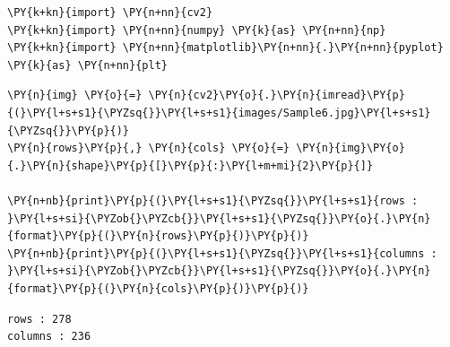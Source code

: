 \vspace{0.5cm}

\begin{tcolorbox}[breakable, size=fbox, boxrule=1pt, pad at break*=1mm,colback=cellbackground, colframe=cellborder]
	\begin{Verbatim}[commandchars=\\\{\}]
\PY{k+kn}{import} \PY{n+nn}{cv2}
\PY{k+kn}{import} \PY{n+nn}{numpy} \PY{k}{as} \PY{n+nn}{np}
\PY{k+kn}{import} \PY{n+nn}{matplotlib}\PY{n+nn}{.}\PY{n+nn}{pyplot} \PY{k}{as} \PY{n+nn}{plt}
	\end{Verbatim}
\end{tcolorbox}

\begin{tcolorbox}[breakable, size=fbox, boxrule=1pt, pad at break*=1mm,colback=cellbackground, colframe=cellborder]
	\begin{Verbatim}[commandchars=\\\{\}]
\PY{n}{img} \PY{o}{=} \PY{n}{cv2}\PY{o}{.}\PY{n}{imread}\PY{p}{(}\PY{l+s+s1}{\PYZsq{}}\PY{l+s+s1}{images/Sample6.jpg}\PY{l+s+s1}{\PYZsq{}}\PY{p}{)}
\PY{n}{rows}\PY{p}{,} \PY{n}{cols} \PY{o}{=} \PY{n}{img}\PY{o}{.}\PY{n}{shape}\PY{p}{[}\PY{p}{:}\PY{l+m+mi}{2}\PY{p}{]}
		
\PY{n+nb}{print}\PY{p}{(}\PY{l+s+s1}{\PYZsq{}}\PY{l+s+s1}{rows : }\PY{l+s+si}{\PYZob{}\PYZcb{}}\PY{l+s+s1}{\PYZsq{}}\PY{o}{.}\PY{n}{format}\PY{p}{(}\PY{n}{rows}\PY{p}{)}\PY{p}{)}
\PY{n+nb}{print}\PY{p}{(}\PY{l+s+s1}{\PYZsq{}}\PY{l+s+s1}{columns : }\PY{l+s+si}{\PYZob{}\PYZcb{}}\PY{l+s+s1}{\PYZsq{}}\PY{o}{.}\PY{n}{format}\PY{p}{(}\PY{n}{cols}\PY{p}{)}\PY{p}{)}
	\end{Verbatim}
\end{tcolorbox}

\begin{Verbatim}[commandchars=\\\{\}]
rows : 278
columns : 236
\end{Verbatim}

